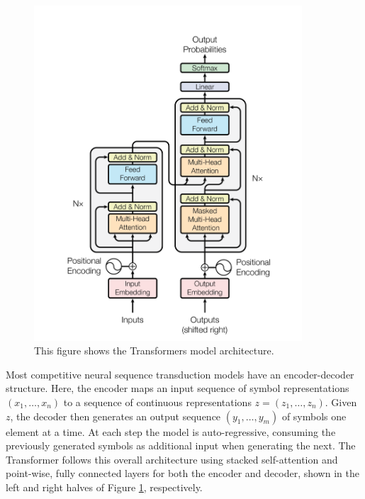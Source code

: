 \begin{figure}[H]
    \centering
    \includegraphics[width=10cm, keepaspectratio]{chapters/1_introduction/imgs/transformers.png}
    \caption{This figure shows the Transformers model architecture.}
    \label{fig:transarch}
\end{figure}

Most competitive neural sequence transduction models have an encoder-decoder structure.
Here, the encoder maps an input sequence of symbol representations $(x_1, \ldots, x_n)$ to a sequence
of continuous representations $z = (z_1, \ldots, z_n)$. Given $z$, the decoder then generates an output
sequence $(y_1, \ldots, y_m)$ of symbols one element at a time. At each step the model is auto-regressive, consuming the previously generated symbols as additional input when generating the next.
The Transformer follows this overall architecture using stacked self-attention and point-wise, fully
connected layers for both the encoder and decoder, shown in the left and right halves of Figure \ref{fig:transarch}, respectively.

